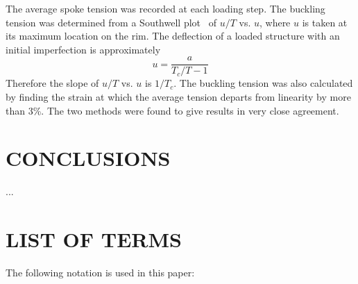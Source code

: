 \documentclass{bmd2016p}
\begin{document}
The average spoke tension was recorded at each loading step. The buckling tension was determined from a Southwell plot~\cite{Timoshenko1961a} of $u/T$ vs. $u$, where $u$ is taken at its maximum location on the rim. The deflection of a loaded structure with an initial imperfection is approximately
	\begin{equation}\label{eq:Southwell}
	u = \frac{a}{T_c/T - 1}
	\end{equation}
Therefore the slope of $u/T$ vs. $u$ is $1/T_c$. The buckling tension was also calculated by finding the strain at which the average tension departs from linearity by more than 3\%. The two methods were found to give results in very close agreement.


\section{CONCLUSIONS}
...






\newpage
\section*{LIST OF TERMS}
The following notation is used in this paper:
\end{document}
